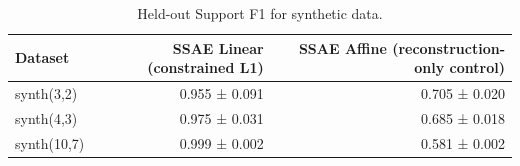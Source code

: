 \begin{table}[t]
\centering
\caption{Held-out Support F1 for synthetic data.}
\label{tab:synthetic-support-f1}
\begin{tabular}{lrr}
\toprule
Dataset & SSAE Linear (constrained L1) & SSAE Affine (reconstruction-only control) \\
\midrule
synth(3,2) & 0.955 ± 0.091 & 0.705 ± 0.020 \\
synth(4,3) & 0.975 ± 0.031 & 0.685 ± 0.018 \\
synth(10,7) & 0.999 ± 0.002 & 0.581 ± 0.002 \\
\bottomrule
\end{tabular}
\end{table}
